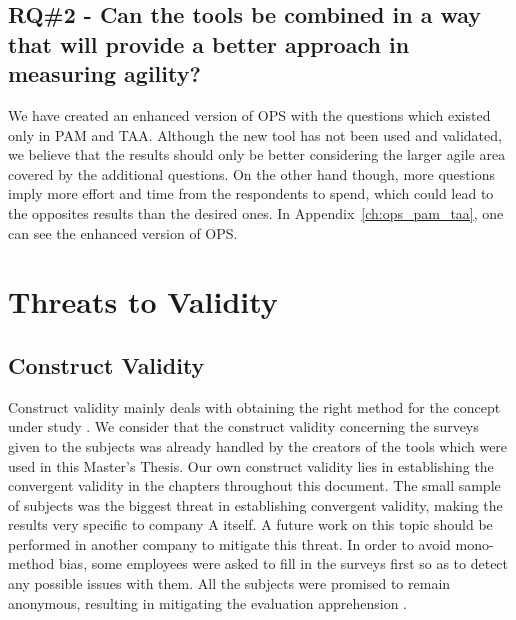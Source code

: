 \subsection{RQ\#2 - Can the tools be combined in a way that will provide a better approach in measuring agility?}

We have created an enhanced version of \ac{OPS} with the questions which existed only in \ac{PAM} and \ac{TAA}. Although the new tool has not been used and validated, we believe that the results should only be better considering the larger agile area covered by the additional questions. On the other hand though, more questions imply more effort and time from the respondents to spend, which could lead to the opposites results than the desired ones. In Appendix~\ref{ch:ops_pam_taa}, one can see the enhanced version of \ac{OPS}.

\section{Threats to Validity}

\subsection{Construct Validity}
Construct validity mainly deals with obtaining the right method for the concept under study \cite{Wohlin}. We consider that the construct validity concerning the surveys given to the subjects was already handled by the creators of the tools which were used in this Master's Thesis. Our own construct validity lies in establishing the convergent validity in the chapters throughout this document. The small sample of subjects was the biggest threat in establishing convergent validity, making the results very specific to company A itself. A future work on this topic should be performed in another company to mitigate this threat. In order to avoid mono-method bias, some employees were asked to fill in the surveys first so as to detect any possible issues with them. All the subjects were promised to remain anonymous, resulting in mitigating the evaluation apprehension \cite{wohlin2012expse}. 

